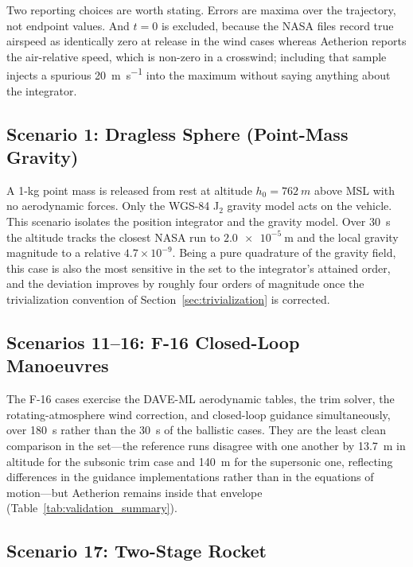 \documentclass[a4paper,10pt]{article}
\theoremstyle{definition}
\begin{document}
Two reporting choices are worth stating.  Errors are maxima over the
trajectory, not endpoint values.  And $t = 0$ is excluded, because the NASA
files record true airspeed as identically zero at release in the wind cases
whereas Aetherion reports the air-relative speed, which is non-zero in a
crosswind; including that sample injects a spurious
\SI{20}{\metre\per\second} into the maximum without saying anything about
the integrator.

\subsection{Scenario 1: Dragless Sphere (Point-Mass Gravity)}

A 1-kg point mass is released from rest at altitude
$h_0 = \SI{762}{m}$ above MSL with no aerodynamic forces.  Only the WGS-84
J$_2$ gravity model acts on the vehicle.  This scenario isolates the position
integrator and the gravity model.  Over \SI{30}{\second} the altitude tracks
the closest NASA run to $\SI{2.0e-5}{\metre}$ and the local gravity magnitude
to a relative $4.7\times10^{-9}$.  Being a pure quadrature of the gravity
field, this case is also the most sensitive in the set to the integrator's
attained order, and the deviation improves by roughly four orders of magnitude
once the trivialization convention of Section~\ref{sec:trivialization} is
corrected.

\subsection{Scenarios 11--16: F-16 Closed-Loop Manoeuvres}

The F-16 cases exercise the DAVE-ML aerodynamic tables, the trim solver, the
rotating-atmosphere wind correction, and closed-loop guidance simultaneously,
over \SI{180}{\second} rather than the \SI{30}{\second} of the ballistic
cases.  They are the least clean comparison in the set---the reference runs
disagree with one another by \SI{13.7}{\metre} in altitude for the subsonic
trim case and \SI{140}{\metre} for the supersonic one, reflecting differences
in the guidance implementations rather than in the equations of motion---but
Aetherion remains inside that envelope
(Table~\ref{tab:validation_summary}).

\subsection{Scenario 17: Two-Stage Rocket}
\end{document}

